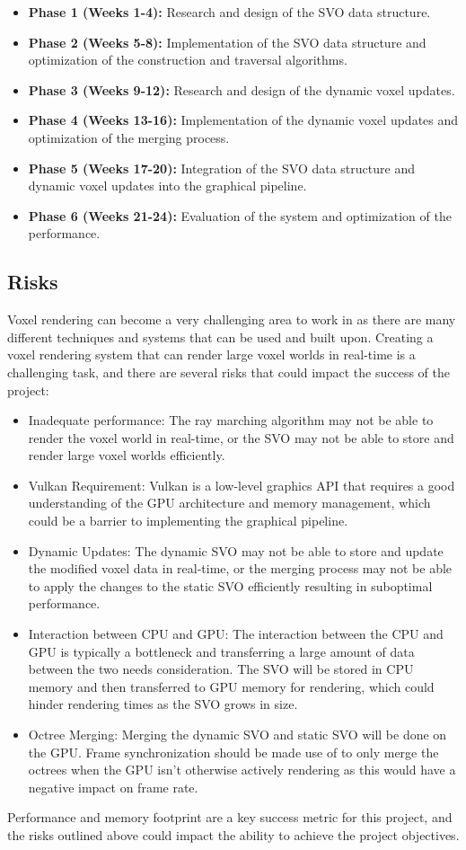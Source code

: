 \documentclass{article}
\begin{document}
\begin{itemize}
    \item \textbf{Phase 1 (Weeks 1-4):} Research and design of the SVO data structure.
    \item \textbf{Phase 2 (Weeks 5-8):} Implementation of the SVO data structure and optimization of the construction and traversal algorithms.
    \item \textbf{Phase 3 (Weeks 9-12):} Research and design of the dynamic voxel updates.
    \item \textbf{Phase 4 (Weeks 13-16):} Implementation of the dynamic voxel updates and optimization of the merging process.
    \item \textbf{Phase 5 (Weeks 17-20):} Integration of the SVO data structure and dynamic voxel updates into the graphical pipeline.
    \item \textbf{Phase 6 (Weeks 21-24):} Evaluation of the system and optimization of the performance.
\end{itemize}

\subsection{Risks}
Voxel rendering can become a very challenging area to work in as there are many different techniques and systems that can be used and built upon. Creating a voxel rendering system that can render large voxel worlds in real-time is a challenging task, and there are several risks that could impact the success of the project:

\begin{itemize}
    \item Inadequate performance: The ray marching algorithm may not be able to render the voxel world in real-time, or the SVO may not be able to store and render large voxel worlds efficiently.
    \item Vulkan Requirement: Vulkan is a low-level graphics API that requires a good understanding of the GPU architecture and memory management, which could be a barrier to implementing the graphical pipeline.
    \item Dynamic Updates: The dynamic SVO may not be able to store and update the modified voxel data in real-time, or the merging process may not be able to apply the changes to the static SVO efficiently resulting in suboptimal performance.
    \item Interaction between CPU and GPU: The interaction between the CPU and GPU is typically a bottleneck and transferring a large amount of data between the two needs consideration. The SVO will be stored in CPU memory and then transferred to GPU memory for rendering, which could hinder rendering times as the SVO grows in size.
    \item Octree Merging: Merging the dynamic SVO and static SVO will be done on the GPU. Frame synchronization should be made use of to only merge the octrees when the GPU isn't otherwise actively rendering as this would have a negative impact on frame rate.
\end{itemize}

Performance and memory footprint are a key success metric for this project, and the risks outlined above could impact the ability to achieve the project objectives.



\end{document}
